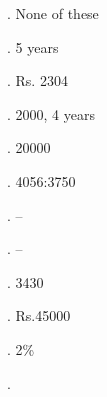 \documentclass{article}
\begin{document}
	\noindent 
	
	. None of these
	
	\noindent 
	
	. 5 years
	
	\noindent 
	
	. Rs. 2304
	
	\noindent 
	
	. 2000, 4 years
	
	\noindent 
	
	. 20000
	
	\noindent 
	
	. 4056:3750
	
	\noindent 
	
	. --
	
	\noindent 
	
	. --
	
	\noindent 
	
	. 3430
	
	\noindent 
	
	. Rs.45000
	
	\noindent 
	
	. 2\%
	
	. 
	
\end{document}
